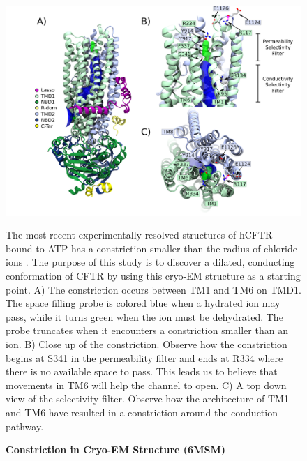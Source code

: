 \begin{figure}
	\begin{center}
		\includegraphics[width=1\textwidth]{figures/opening/overall_hole_constricted.pdf}
	\end{center}
	\captionsetup{singlelinecheck = false, justification=raggedright}
	\caption[Constriction in Cryo-EM Structure (6MSM)] {\textbf{Constriction in Cryo-EM Structure (6MSM)}}{The most recent experimentally resolved structures of hCFTR bound to ATP has a constriction smaller than the radius of chloride ions \cite{zhang2018}. The purpose of this study is to discover a dilated, conducting conformation of CFTR by using this cryo-EM structure as a starting point. A) The constriction occurs between TM1 and TM6 on TMD1. The space filling probe is colored blue when a hydrated ion may pass, while it turns green when the ion must be dehydrated. The probe truncates when it encounters a constriction smaller than an ion. B) Close up of the constriction. Observe how the constriction begins at S341 in the permeability filter and ends at R334 where there is no available space to pass. This leads us to believe that movements in TM6 will help the channel to open. C) A top down view of the selectivity filter. Observe how the architecture of TM1 and TM6 have resulted in a constriction around the conduction pathway.}
	\label{constricted_sel_filter}
\end{figure}


